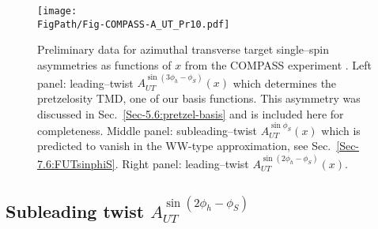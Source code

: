\documentclass[a4paper,11pt]{article}
\newcommand*{\FigPath}{./figs}%
\begin{document}
\newpage

\begin{figure}[b]
\centering
\texttt{[image: \\FigPath/Fig-COMPASS-A\_UT\_Pr10.pdf]}

\vspace{-5mm}

\caption{\label{autsinphi_jlab} 
	Preliminary data for azimuthal transverse target single--spin 
	asymmetries as functions of $x$ from the COMPASS experiment 
	\cite{Parsamyan:2015dfa}.
	Left panel: 
	leading--twist $A_{UT}^{\sin(3\phi_h-\phi_S)}(x)$ which 
	determines the pretzelosity TMD, one of our basis functions. 
	This asymmetry was discussed in Sec.~\ref{Sec-5.6:pretzel-basis} 
	and is included here for completeness. 
	Middle panel: 
	subleading--twist $A_{UT}^{\sin\phi_S}(x)$ which is predicted to vanish
	in the WW-type approximation, see Sec.~\ref{Sec-7.6:FUTsinphiS}.
	Right panel: 
	leading--twist $A_{UT}^{\sin(2\phi_h-\phi_S)}(x)$.}
\end{figure}


\subsection{\boldmath Subleading twist  $A_{UT}^{\sin(2\phi_h-\phi_S)}$ }
\label{Sec-7.8:FUTsin2phi-phiS}
\end{document}
